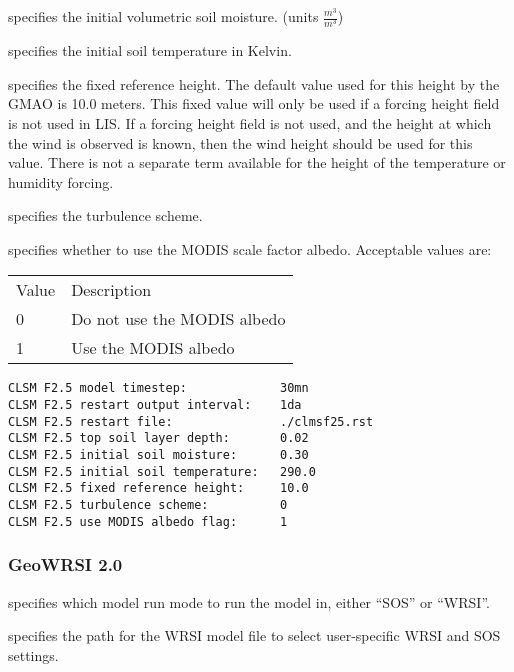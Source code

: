   specifies the
 initial volumetric soil moisture. (units $\frac{m^3}{m^3}$)

  specifies the
 initial soil temperature in Kelvin.

  specifies the fixed
 reference height.  The default value used for this height by
 the GMAO is 10.0 meters.  This fixed value will only be used
 if a forcing height field is not used in LIS.  If a forcing
 height field is not used, and the height at which the wind
 is observed is known, then the wind height should be used
 for this value.  There is not a separate term available
 for the height of the temperature or humidity forcing.

  specifies the
 turbulence scheme.

  specifies
 whether to use the MODIS scale factor albedo.
 Acceptable values are:

 \begin{tabular}{ll}
 Value & Description                 \\
 0     & Do not use the MODIS albedo \\
 1     & Use the MODIS albedo        \\
 \end{tabular}

 \begin{Verbatim}[frame=single]
CLSM F2.5 model timestep:             30mn
CLSM F2.5 restart output interval:    1da
CLSM F2.5 restart file:               ./clmsf25.rst
CLSM F2.5 top soil layer depth:       0.02
CLSM F2.5 initial soil moisture:      0.30
CLSM F2.5 initial soil temperature:   290.0
CLSM F2.5 fixed reference height:     10.0
CLSM F2.5 turbulence scheme:          0
CLSM F2.5 use MODIS albedo flag:      1
 \end{Verbatim}

 
 \subsubsection{GeoWRSI 2.0} \label{sssec:geowrsi.2}
 

 
  specifies which model run
 mode to run the model in, either ``SOS'' or ``WRSI''.

  specifies the path for the
 WRSI model file to select user-specific WRSI and SOS settings.

